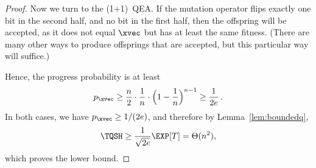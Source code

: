 \begin{proof}
  Now we turn to the (1+1)~QEA. If the mutation operator flips exactly
  one bit in the second half, and no bit in the first half, then the
  offspring will be accepted, as it does not equal $\xvec$ but has at
  least the same fitness. (There are many other ways to produce
  offsprings that are accepted, but this particular way will suffice.)

  Hence, the progress probability is at least
  \[
  p_{\xvec} \ge
  \frac{n}{2}\cdot\frac{1}{n}\cdot\Big(1-\frac{1}{n}\Big)^{n-1}\ge
  \frac{1}{2e}\,.
  \]
  In both cases, we have $p_{\xvec} \geq 1/(2e)$, and therefore by
  Lemma~\ref{lem:boundedq},
  \[
  \TQSH \ge \frac{1}{\sqrt{2e}} \EXP[T] = \Theta(n^2),
  \]
  which proves the lower bound.
\end{proof}
